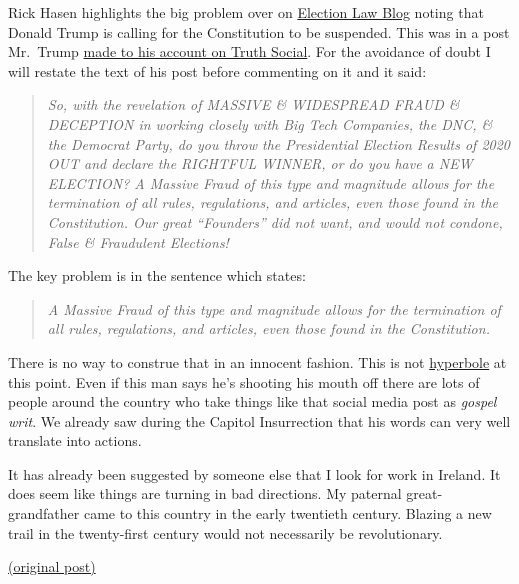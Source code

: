 Rick Hasen highlights the big problem over on
\href{https://electionlawblog.org/?p=133491}{Election Law Blog} noting
that Donald Trump is calling for the Constitution to be suspended. This
was in a post Mr.~Trump
\href{http://web.archive.org/web/20221203171848/https://truthsocial.com/@realDonaldTrump/posts/109449803240069864}{made
to his account on Truth Social}. For the avoidance of doubt I will
restate the text of his post before commenting on it and it said:

\begin{quote}
\emph{So, with the revelation of MASSIVE \& WIDESPREAD FRAUD \&
DECEPTION in working closely with Big Tech Companies, the DNC, \& the
Democrat Party, do you throw the Presidential Election Results of 2020
OUT and declare the RIGHTFUL WINNER, or do you have a NEW ELECTION? A
Massive Fraud of this type and magnitude allows for the termination of
all rules, regulations, and articles, even those found in the
Constitution. Our great ``Founders'' did not want, and would not
condone, False \& Fraudulent Elections!}
\end{quote}

The key problem is in the sentence which states:

\begin{quote}
\emph{A Massive Fraud of this type and magnitude allows for the
termination of all rules, regulations, and articles, even those found in
the Constitution.}
\end{quote}

There is no way to construe that in an innocent fashion. This is not
\href{http://web.archive.org/web/20221203220850/https://twitter.com/MEPFuller/status/1599105374086258688?s=20&t=RM6FZujmSnUdnEG9LYJr_Q}{hyperbole}
at this point. Even if this man says he's shooting his mouth off there
are lots of people around the country who take things like that social
media post as \emph{gospel writ}. We already saw during the Capitol
Insurrection that his words can very well translate into actions.

It has already been suggested by someone else that I look for work in
Ireland. It does seem like things are turning in bad directions. My
paternal great-grandfather came to this country in the early twentieth
century. Blazing a new trail in the twenty-first century would not
necessarily be revolutionary.

\href{http://web.archive.org/web/20221203223518/https://twitter.com/BillKristol/status/1599161590829711362}{(original
post)}
